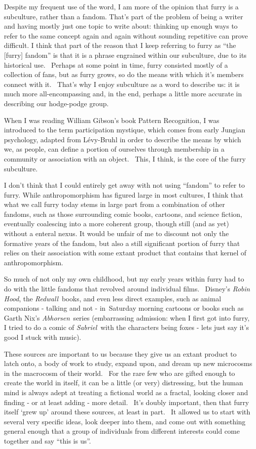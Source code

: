 Despite my frequent use of the word, I am more of the opinion that furry
is a subculture, rather than a fandom. That's part of the problem of
being a writer and having mostly just one topic to write about: thinking
up enough ways to refer to the same concept again and again without
sounding repetitive can prove difficult. I think that part of the reason
that I keep referring to furry as ``the {[}furry{]} fandom'' is that it
is a phrase engrained within our subculture, due to its historical use.
~Perhaps at some point in time, furry consisted mostly of a collection
of fans, but as furry grows, so do the means with which it's members
connect with it. ~That's why I enjoy subculture as a word to describe
us: it is much more all-encompassing and, in the end, perhaps a little
more accurate in describing our hodge-podge group.

When I was reading William Gibson's book Pattern Recognition, I was
introduced to the term participation mystique, which comes from early
Jungian psychology, adapted from Lévy-Bruhl in order to describe the
means by which we, as people, can define a portion of ourselves through
membership in a community or association with an object. ~This, I think,
is the core of the furry subculture.

I don't think that I could entirely get away with not using ``fandom''
to refer to furry. While anthropomorphism has figured large in most
cultures, I think that what we call furry today stems in large part from
a combination of other fandoms, such as those surrounding comic books,
cartoons, and science fiction, eventually coalescing into a more
coherent group, though still (and as yet) without a enteral nexus. It
would be unfair of me to discount not only the formative years of the
fandom, but also a still significant portion of furry that relies on
their association with some extant product that contains that kernel of
anthropomorphism.

So much of not only my own childhood, but my early years within furry
had to do with the little fandoms that revolved around individual films.
~Disney's \emph{Robin Hood}, the \emph{Redwall}~books, and even less
direct examples, such as animal companions - talking and not -
in~Saturday morning cartoons or books such as Garth Nix's
\emph{Abhorsen}~series (embarrassing admission: when I first got into
furry, I tried to do a comic of \emph{Sabriel}~with the characters being
foxes - lets just say it's good I stuck with music).

These sources are important to us because they give us an extant product
to latch onto, a body of work to study, expand upon, and dream up new
microcosms in the macrocosm of their world. ~For the rare few who are
gifted enough to create the world in itself, it can be a little (or
very) distressing, but the human mind is always adept at treating a
fictional world as a fractal, looking closer and finding - or at least
adding - more detail. ~It's doubly important, then that furry itself
`grew up' around these sources, at least in part. ~It allowed us to
start with several very specific ideas, look deeper into them, and come
out with something general enough that a group of individuals from
different interests could come together and say ``this is us''.

